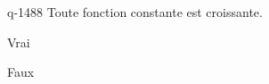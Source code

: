 \begin{truefalse}{q-1488}
Toute fonction constante est croissante.
\item* Vrai
\item Faux
\end{truefalse}

